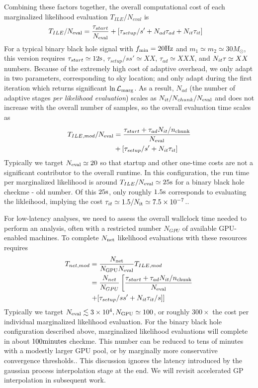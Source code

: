 \documentclass[twocolumn,prd,nofootinbib]{revtex4}
\newcommand\unit[1]{{\rm #1}}
\newcommand\editremark[1]{{\color{red} #1}}
\begin{document}
%
Combining these factors together, the overall computational cost of each marginalized likelihood
evaluation $T_{ILE}/N_{eval}$  is
\begin{align}
T_{ILE}/N_{\rm eval} &= \frac{\tau_{start}}{N_{\rm eval}} 
 + 
 [ \tau_{setup}/s' + N_{ad} \tau_{ad} + N_{it}\tau_{it}
 ] 
\end{align}
For a typical binary black hole signal with $f_{\rm min}=20 \unit{Hz}$ and $m_1\simeq m_2\simeq 30 M_\odot$, this
version requires $\tau_{start} \simeq 12\unit{s}$, $\tau_{setup}/ss' \simeq XX$, $\tau_{ad}\simeq XXX$, and $N_{it}\tau_{\it} \simeq XX$
\editremark{numbers}.  
Because of the extremely high cost of adaptive overhead, we only adapt in two parameters, corresponding to sky location; 
and only adapt during the first iteration which returns significant $\ln {\cal L}_{\rm marg}$.  As a result, $N_{ad}$
(the number of adaptive stages \emph{per likelihood evaluation}) scales as $N_{it}/N_{chunk}/N_{\rm eval}$ and does not
increase with the overall number of samples, so the overall evaluation time scales as
\begin{align}
T_{ILE,mod}/N_{\rm eval} &= \frac{\tau_{start} + \tau_{ad}N_{it}/n_{\rm chunk}}{N_{\rm eval}} 
 \nonumber \\ &
 + 
 [ \tau_{setup}/s'  + N_{it}\tau_{it}
 ] 
\end{align}
Typically we target $N_{\rm eval} \simeq 20$ so that startup and other one-time costs  are not a significant contributor to the overall
runtime.   In this configuration, the run time per marginalized likelihood is around $T_{ILE}/N_{\rm eval} \simeq 25
\unit{s}$ for a binary black hole \editremark{checkme - old number}.    Of this $25 \unit{s}$, only roughly
$1.5\unit{s}$ corresponds to evaluating the likleihood, implying the cost $\tau_{it} \simeq 1.5/N_{\rm it} \simeq
7.5\times 10^{-7}$..


For low-latency analyses, we need to assess the overall wallclock time needed to perform an analysis, often with a
restricted number $N_{GPU}$ of available GPU-enabled machines.   To  complete $N_{\rm net}$ likelihood evaluations
with these resources requires
\begin{align}
T_{net,mod} &= \frac{N_{\rm net}}{N_{\rm GPU} N_{\rm eval}} T_{ILE,mod} \nonumber \\
& =
  \frac{N_{net}}{N_{GPU}}\left[
\frac{\tau_{start} + \tau_{ad}N_{it}/n_{\rm chunk}}{N_{\rm eval}} 
 \right. \nonumber \\
& \left. + 
 [ \tau_{setup}/ss'  + N_{it}\tau_{it}/s
 ] 
 \right]
\end{align}
Typically we target $N_{\rm eval}  \lesssim 3\times 10^4, N_{\rm GPU} \simeq 100$, or roughly $300\times$ the cost per
individual marginalized likelihood evaluation.  For the binary black hole configuration described above, marginalized
likelihood evaluations will complete in about $100 \unit{minutes}$ \editremark{checkme}. This number can be reduced to
tens of minutes with a modestly larger GPU pool, or by marginally more conservative convergence thresholds..
This discussion ignores the latency introduced by the  gaussian process interpolation stage at the end.  We will revisit
accelerated GP interpolation in subsequent work.
\end{document}
